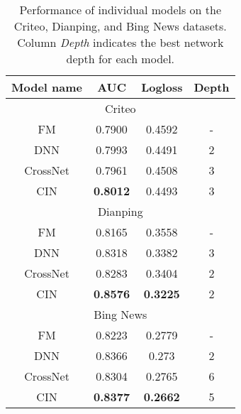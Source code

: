   \begin{table}[ht]
     \centering
     \caption{Performance of individual models on the Criteo, Dianping, and Bing News datasets. Column \textsl{Depth} indicates the best network depth for each model.  }
     \begin{tabular}{c|cc|c} \hline\hline  
        Model name &  AUC & Logloss & Depth \\ \hline  
        \multicolumn{4}{c}{Criteo}\\ \hline  
        FM    & 0.7900   & 0.4592  &  -  \\ \hline           
        DNN & 0.7993  &  0.4491 &  2 \\ \hline   
        CrossNet &  0.7961 & 0.4508 & 3 \\  \hline
        CIN & \textbf{0.8012}  &  0.4493 &  3 \\ \hline   
         \multicolumn{4}{c}{Dianping}\\ \hline  
         FM    & 0.8165  & 0.3558  &  -  \\ \hline           
        DNN & 0.8318  &  0.3382 &  3 \\ \hline   
        CrossNet &  0.8283 & 0.3404 & 2 \\  \hline
        CIN & \textbf{0.8576}  &  \textbf{0.3225} &  2 \\ \hline    
          \multicolumn{4}{c}{Bing News}\\ \hline  
         FM    & 0.8223 & 0.2779  &  -  \\ \hline           
        DNN & 0.8366  &  0.273 &  2 \\ \hline   
        CrossNet &  0.8304 & 0.2765 & 6 \\  \hline
        CIN & \textbf{0.8377}  &  \textbf{0.2662} &  5 \\ \hline \hline  
     \end{tabular}
     \label{tab:cin} 
 \end{table}
